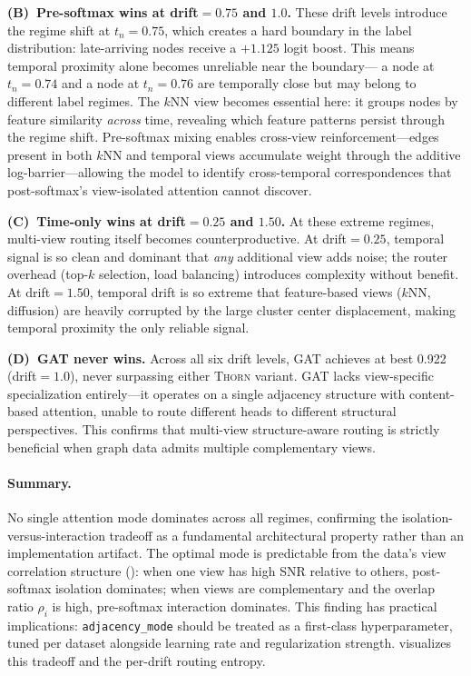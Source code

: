 \documentclass[11pt,a4paper]{article}
\newcommand{\thorn}{\textsc{Thorn}}
\begin{document}
\textbf{(B)~Pre-softmax wins at drift${}=0.75$ and $1.0$.}
These drift levels introduce the regime shift at $t_n = 0.75$, which
creates a hard boundary in the label distribution: late-arriving nodes
receive a $+1.125$ logit boost.
This means temporal proximity alone becomes unreliable near the boundary---
a node at $t_n = 0.74$ and a node at $t_n = 0.76$ are temporally close
but may belong to different label regimes.
The $k$NN view becomes essential here: it groups nodes by feature
similarity \emph{across} time, revealing which feature patterns persist
through the regime shift.
Pre-softmax mixing enables cross-view reinforcement---edges present in
both $k$NN and temporal views accumulate weight through the additive
log-barrier---allowing the model to identify cross-temporal correspondences
that post-softmax's view-isolated attention cannot discover.

\textbf{(C)~Time-only wins at drift${}=0.25$ and $1.50$.}
At these extreme regimes, multi-view routing itself becomes
counterproductive.
At drift${} = 0.25$, temporal signal is so clean and dominant that
\emph{any} additional view adds noise; the router overhead (top-$k$
selection, load balancing) introduces complexity without benefit.
At drift${} = 1.50$, temporal drift is so extreme that feature-based
views ($k$NN, diffusion) are heavily corrupted by the large cluster
center displacement, making temporal proximity the only reliable signal.

\textbf{(D)~GAT never wins.}
Across all six drift levels, GAT achieves at best 0.922 (drift${} = 1.0$),
never surpassing either \thorn{} variant.
GAT lacks view-specific specialization entirely---it operates on a single
adjacency structure with content-based attention, unable to route different
heads to different structural perspectives.
This confirms that multi-view structure-aware routing is strictly
beneficial when graph data admits multiple complementary views.

\paragraph{Summary.}
No single attention mode dominates across all regimes, confirming the
isolation-versus-interaction tradeoff as a fundamental architectural
property rather than an implementation artifact.
The optimal mode is predictable from the data's view correlation structure
(): when one view has high SNR relative to others,
post-softmax isolation dominates; when views are complementary and the
overlap ratio $\rho_i$ is high, pre-softmax interaction dominates.
This finding has practical implications: \texttt{adjacency\_mode} should
be treated as a first-class hyperparameter, tuned per dataset alongside
learning rate and regularization strength.
 visualizes this tradeoff and the per-drift
routing entropy.
\end{document}
